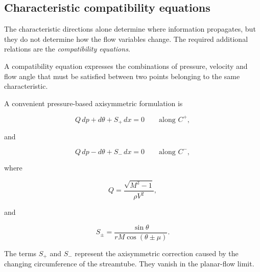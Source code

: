 \begin{landscape}
\begin{center}
\vspace{0.35cm}

\label{fig:mach_angle_characteristic_geometry}
\end{center}

\end{landscape}
\clearpage
\subsection{Characteristic compatibility equations}

The characteristic directions alone determine where information
propagates, but they do not determine how the flow variables change.
The required additional relations are the
\emph{compatibility equations}.

A compatibility equation expresses the combinations of pressure,
velocity and flow angle that must be satisfied between two points
belonging to the same characteristic.

A convenient pressure-based axisymmetric formulation is

\begin{equation}
    Q\,dp+d\theta+S_+\,dx=0
    \qquad \text{along } C^+,
    \label{eq:compatibility_plus}
\end{equation}

and

\begin{equation}
    Q\,dp-d\theta+S_-\,dx=0
    \qquad \text{along } C^-,
    \label{eq:compatibility_minus}
\end{equation}

where

\begin{equation}
    Q
    =
    \frac{\sqrt{M^2-1}}{\rho V^2},
    \label{eq:moc_Q}
\end{equation}

and

\begin{equation}
    S_\pm
    =
    \frac{\sin\theta}
    {rM\cos(\theta\pm\mu)}.
    \label{eq:moc_axisymmetric_source}
\end{equation}

The terms $S_+$ and $S_-$ represent the axisymmetric correction caused
by the changing circumference of the streamtube. They vanish in the
planar-flow limit.

